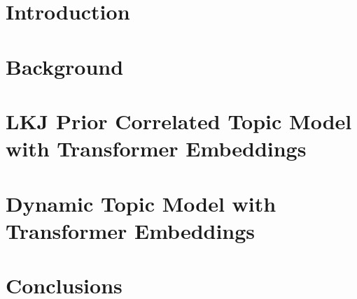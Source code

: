 \documentclass[master,final,11pt]{iscs-thesis}
\date{\today}
\begin{document}
\begin{eabstract}

\end{eabstract}
\begin{jabstract}

\end{jabstract}
\maketitle
\frontmatter %
\tableofcontents %
\listoffigures %
\listoftables %
\listofalgorithms
\mainmatter %
\titlepage
\chapter{Introduction}\label{ch1}



\chapter{Background}\label{ch2}

%
%
%
\chapter{LKJ Prior Correlated Topic Model with Transformer Embeddings}\label{ch4}



\chapter{Dynamic Topic Model with Transformer Embeddings}\label{ch5}



\chapter{Conclusions}\label{ch6}

\cite{wallach_rethinking_nodate}
%
\end{document}

